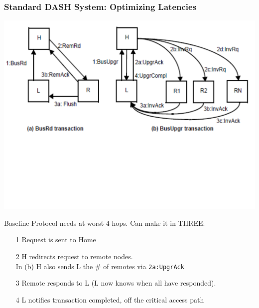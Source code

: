 \documentclass{beamer}
\renewcommand{\emph}[1]{\textcolor{structure}{#1}}
\newcommand{\emp}[1]{\textcolor{DikuRed}{ #1}}
\begin{document}
\begin{frame}[fragile,t]
\frametitle{Standard DASH System: Optimizing Latencies}

\includegraphics[width=55ex]{Figures/FigsInfCoherence/RedLatencyCCNUMA}
\vspace{-15ex}

Baseline Protocol needs at worst 4 hops. 
\emph{Can make it in THREE}:\pause
\begin{itemize}
    \item[1] Request is sent to Home
    \item[2] H redirects request to remote nodes.\\ 
             In (b) H also sends L the \# of remotes via {\tt 2a:UpgrAck}
    \item[3] Remote responds to L (L now knows when all have responded).\medskip
    \item[4] L notifies transaction completed, \emp{off the critical access path}
\end  {itemize}

\end{frame}
\end{document}
